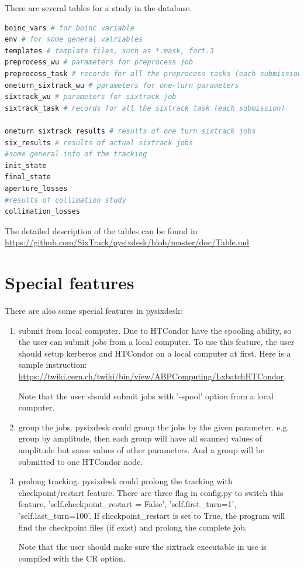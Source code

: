 There are several tables for a study in the database. 
\begin{lstlisting}[language=Python]
boinc_vars # for boinc variable
env # for some general valriables 
templates # template files, such as *.mask, fort.3
preprocess_wu # parameters for preprocess job
preprocess_task # records for all the preprocess tasks (each submission)
oneturn_sixtrack_wu # parameters for one-turn parameters
sixtrack_wu # parameters for sixtrack job
sixtrack_task # records for all the sixtrack task (each submission)

oneturn_sixtrack_results # results of one turn sixtrack jobs
six_results # results of actual sixtrack jobs
#some general info of the tracking
init_state
final_state
aperture_losses
#results of collimation study
collimation_losses
\end{lstlisting}
The detailed description of the tables can be found in \url{https://github.com/SixTrack/pysixdesk/blob/master/doc/Table.md}

\section{Special features}

There are also some special features in pysixdesk:
\begin{enumerate}
\item submit from local computer. Due to HTCondor have the spooling ability, so the user can submit jobs from a local computer. To use this feature, the user should setup kerberos and HTCondor on a local computer at first. Here is a sample instruction:
\url{https://twiki.cern.ch/twiki/bin/view/ABPComputing/LxbatchHTCondor}. 

Note that the user should submit jobs with '-spool' option from a local computer.

\item group the jobs. pysixdesk could group the jobs by the given parameter. e.g. group by amplitude, then each group will have all scanned values of amplitude but same values of other parameters. And a group will be submitted to one HTCondor node.

\item prolong tracking. pysixdesk could prolong the tracking with checkpoint/restart feature. There are three flag in config.py to switch this feature, 'self.checkpoint\_restart = False', 'self.first\_turn=1', 'self.last\_turn=100'. If checkpoint\_restart is set to True, the program will find the checkpoint files (if exist) and prolong the complete job. 

Note that the user should make sure the sixtrack executable in use is compiled with the CR option.
\end{enumerate}

